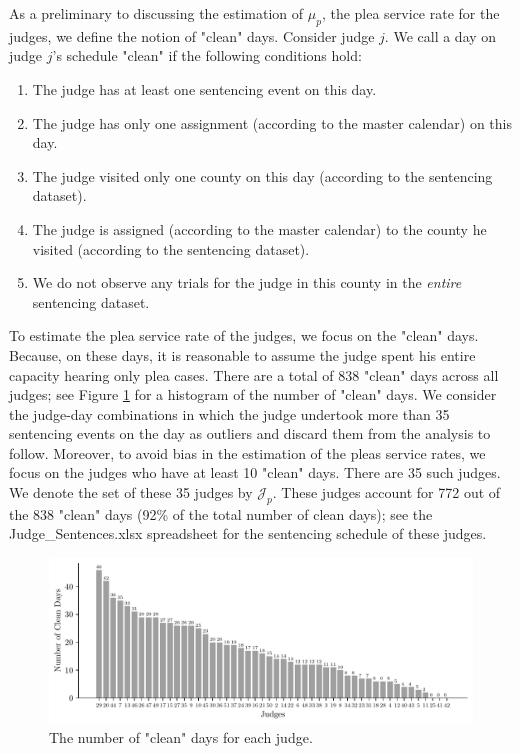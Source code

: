 \documentclass[11pt, oneside]{article}   	%
\theoremstyle{ModifiedStyle}
\begin{document}
As a preliminary to discussing the estimation of $\mu_p$, the plea service rate for the judges, we define the notion of "clean" days. Consider judge $j$. We call a day on judge $j$'s schedule "clean" if the following conditions hold: 
\begin{enumerate}[label=(\roman*)]
	\vspace{-2mm}
	\item The judge has at least one sentencing event on this day. 
	\item The judge has only one assignment (according to the master calendar) on this day.
	\item The judge visited only one county on this day (according to the sentencing dataset). 
	\item The judge is assigned (according to the master calendar) to the county he visited (according to the sentencing dataset).
	\item We do not observe any trials for the judge in this county in the \emph{entire} sentencing dataset. 
\end{enumerate}
\vspace{-1mm}
To estimate the plea service rate of the judges, we focus on the "clean" days. Because, on these days, it is reasonable to assume the judge spent his entire capacity hearing only plea cases. There are a total of $838$ "clean" days across all judges; see Figure \ref{Figure_Judge_Clean_Days_Histogram} for a histogram of the number of "clean" days. We consider the judge-day combinations in which the judge undertook more than 35 sentencing events on the day as outliers and discard them from the analysis to follow. Moreover, to avoid bias in the estimation of the pleas service rates, we focus on the judges who have at least 10 "clean" days. There are 35 such judges. We denote the set of these 35 judges by $\mathcal{J}_p$. These judges account for 772 out of the 838 "clean" days (92\% of the total number of clean days); see the Judge\_Sentences.xlsx spreadsheet for the sentencing schedule of these judges.
%
\begin{figure}[H]
	\centering
	\includegraphics[scale=0.75]{Figures/Judge_Clean_Days_Histogram}
	\vspace{-3mm}
	\caption{The number of "clean" days for each judge.}
	\label{Figure_Judge_Clean_Days_Histogram}
\end{figure}
\end{document}
